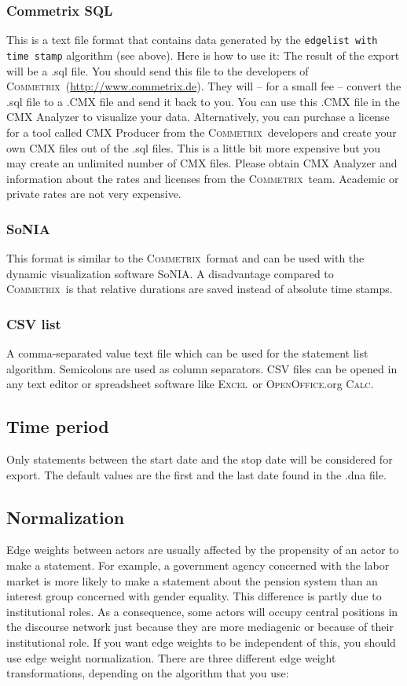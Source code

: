 \documentclass[12pt,a4paper]{scrreprt}
\newcommand{\excel}{\textsc{Excel}}
\newcommand{\calc}{\textsc{OpenOffice}.org \textsc{Calc}}
\newcommand{\commetrix}{\textsc{Commetrix}}
\newcommand{\sonia}{SoNIA}
\newcommand{\code}[1]{\texttt{#1}}
\begin{document}
\subsubsection{Commetrix SQL}\label{cmx}
This is a text file format that contains data generated by the \code{edgelist with time stamp} algorithm (see above). Here is how to use it: The result of the export will be a .sql file. You should send this file to the developers of \commetrix\ (\url{http://www.commetrix.de}). They will -- for a small fee -- convert the .sql file to a .CMX file and send it back to you. You can use this .CMX file in the CMX Analyzer to visualize your data. Alternatively, you can purchase a license for a tool called CMX Producer from the \commetrix\ developers and create your own CMX files out of the .sql files. This is a little bit more expensive but you may create an unlimited number of CMX files. Please obtain CMX Analyzer and information about the rates and licenses from the \commetrix\ team. Academic or private rates are not very expensive.

\subsubsection{SoNIA}
This format is similar to the \commetrix\ format and can be used with the dynamic visualization software \sonia. A disadvantage compared to \commetrix\ is that relative durations are saved instead of absolute time stamps.

\subsubsection{CSV list}
A comma-separated value text file which can be used for the statement list algorithm. Semicolons are used as column separators. CSV files can be opened in any text editor or spreadsheet software like \excel\ or \calc.


\subsection{Time period}
Only statements between the start date and the stop date will be considered for export. The default values are the first and the last date found in the .dna file.

\subsection{Normalization}
Edge weights between actors are usually affected by the propensity of an actor to make a statement. For example, a government agency concerned with the labor market is more likely to make a statement about the pension system than an interest group concerned with gender equality. This difference is partly due to institutional roles. As a consequence, some actors will occupy central positions in the discourse network just because they are more mediagenic or because of their institutional role. If you want edge weights to be independent of this, you should use edge weight normalization. There are three different edge weight transformations, depending on the algorithm that you use:
\end{document}
